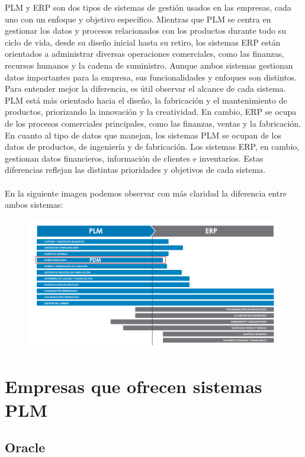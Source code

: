 \documentclass[12pt]{article}
\begin{document}
PLM y ERP son dos tipos de sistemas de gestión usados en las empresas, cada uno con un enfoque y objetivo específico. Mientras que PLM se centra en gestionar los datos y procesos relacionados con los 
productos durante todo su ciclo de vida, desde su diseño inicial hasta su retiro, los sistemas ERP están orientados a administrar diversas operaciones comerciales, como las finanzas, recursos humanos 
y la cadena de suministro. Aunque ambos sistemas gestionan datos importantes para la empresa, sus funcionalidades y enfoques son distintos.
Para entender mejor la diferencia, es útil observar el alcance de cada sistema. PLM está más orientado hacia el diseño, la fabricación y el mantenimiento de productos, priorizando la innovación y 
la creatividad. En cambio, ERP se ocupa de los procesos comerciales principales, como las finanzas, ventas y la fabricación.
En cuanto al tipo de datos que manejan, los sistemas PLM se ocupan de los datos de productos, de ingeniería y de fabricación. Los sistemas ERP, en cambio, gestionan datos financieros, información de 
clientes e inventarios. Estas diferencias reflejan las distintas prioridades y objetivos de cada sistema.
 \\
 \\
 En la siguiente imagen podemos observar con más claridad la diferencia entre ambos sistemas:
\begin{figure}[h!]
    \centering
    \includegraphics[width=.7\textwidth]{esquema-plm-pdm-erp.png}
    \label{fig:my_label}
\end{figure}

\clearpage

\section{Empresas que ofrecen sistemas PLM}

\subsection{Oracle}
\end{document}
